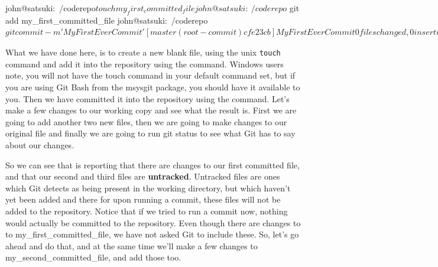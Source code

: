 \begin{code}
john@satsuki:~/coderepo$ touch my_first_committed_file
john@satsuki:~/coderepo$ git add my_first_committed_file
john@satsuki:~/coderepo$ git commit -m 'My First Ever Commit'
[master (root-commit) cfe23cb] My First Ever Commit
 0 files changed, 0 insertions(+), 0 deletions(-)
 create mode 100644 my_first_committed_file
john@satsuki:~/coderepo$
\end{code}

What we have done here, is to create a new blank file, using the unix \texttt{touch} command and add it into the repository using the  command.
Windows users note, you will not have the touch command in your default command set, but if you are using Git Bash from the msysgit package, you should have it available to you.
Then we have committed it into the repository using the  command.
Let's make a few changes to our working copy and see what the result is.
First we are going to add another two new files, then we are going to make changes to our original file and finally we are going to run git status to see what Git has to say about our changes.


So we can see that  is reporting that there are changes to our first committed file, and that our second and third files are \textbf{untracked}.
Untracked files are ones which Git detects as being present in the working directory, but which haven't yet been added and there for upon running a commit, these files will not be added to the repository.
Notice that if we tried to run a commit now, nothing would actually be committed to the repository.
Even though there are changes to to my\_first\_committed\_file, we have not asked Git to include these.
So, let's go ahead and do that, and at the same time we'll make a few changes to my\_second\_committed\_file, and add those too.

